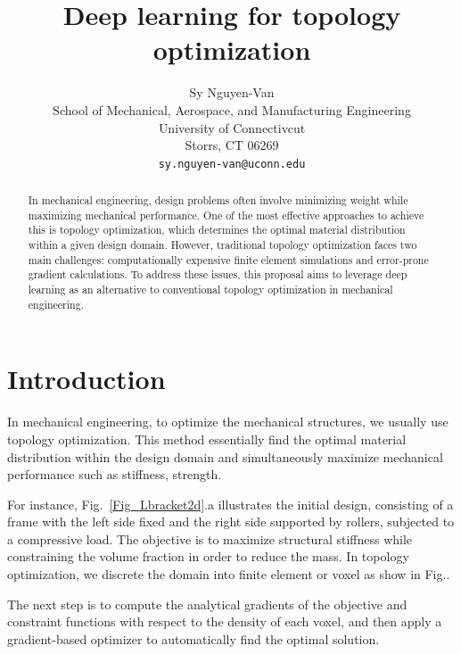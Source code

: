 \documentclass{article} %
\title{Deep learning for topology optimization}
\author{
Sy Nguyen-Van \\
School of Mechanical, Aerospace, and Manufacturing Engineering\\
University of Connectivcut\\
Storrs, CT 06269 \\
\texttt{sy.nguyen-van@uconn.edu} \\
}
\begin{document}
\maketitle

\begin{abstract}
In mechanical engineering, design problems often involve minimizing weight while maximizing mechanical performance. One of the most effective approaches to achieve this is topology optimization, which determines the optimal material distribution within a given design domain. However, traditional topology optimization faces two main challenges: computationally expensive finite element simulations and error-prone gradient calculations. To address these issues, this proposal aims to leverage deep learning as an alternative to conventional topology optimization in mechanical engineering.
\end{abstract}

\section{Introduction}
In mechanical engineering, to optimize the mechanical structures, we usually use topology optimization. This method essentially find the optimal material distribution within the design domain and simultaneously maximize mechanical performance such as stiffness, strength. 

For instance, Fig.~\ref{Fig_Lbracket2d}.a illustrates the initial design, consisting of a frame with the left side fixed and the right side supported by rollers, subjected to a compressive load. The objective is to maximize structural stiffness while constraining the volume fraction in order to reduce the mass. In topology optimization, we discrete the domain into finite element or voxel as show in Fig..

The next step is to compute the analytical gradients of the objective and constraint functions with respect to the density of each voxel, and then apply a gradient-based optimizer to automatically find the optimal solution.
\end{document}
